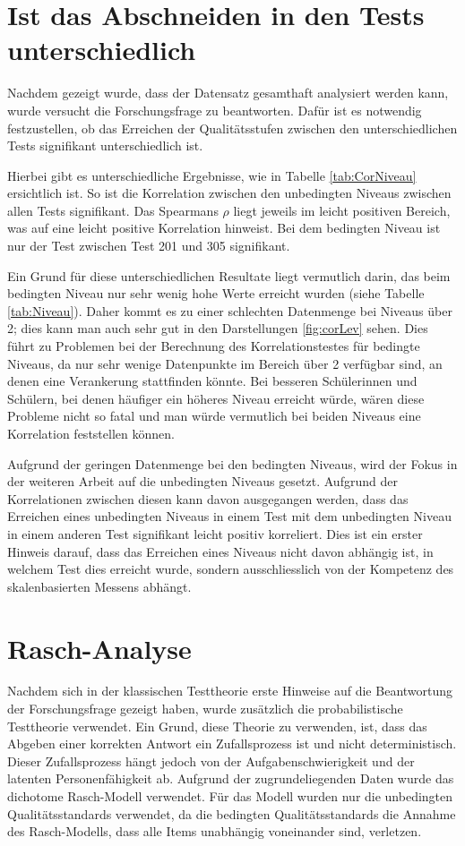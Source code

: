 \section{Ist das Abschneiden in den Tests unterschiedlich}

Nachdem gezeigt wurde, dass der Datensatz gesamthaft analysiert werden kann, wurde versucht die Forschungsfrage zu beantworten. Dafür ist es notwendig festzustellen, ob das Erreichen der Qualitätsstufen zwischen den unterschiedlichen Tests signifikant unterschiedlich ist.

Hierbei gibt es unterschiedliche Ergebnisse, wie in Tabelle \ref{tab:CorNiveau} ersichtlich ist. So ist die Korrelation zwischen den unbedingten Niveaus zwischen allen Tests signifikant. Das Spearmans $\rho$ liegt jeweils im leicht positiven Bereich, was auf eine leicht positive Korrelation hinweist. Bei dem bedingten Niveau ist nur der Test zwischen Test 201 und 305 signifikant.

Ein Grund für diese unterschiedlichen Resultate liegt vermutlich darin, das beim bedingten Niveau nur sehr wenig hohe Werte erreicht wurden (siehe Tabelle \ref{tab:Niveau}). Daher kommt es zu einer schlechten Datenmenge bei Niveaus über 2; dies kann man auch sehr gut in den Darstellungen \ref{fig:corLev} sehen. Dies führt zu Problemen bei der Berechnung des Korrelationstestes für bedingte Niveaus, da nur sehr wenige Datenpunkte im Bereich über 2 verfügbar sind, an denen eine Verankerung stattfinden könnte. Bei besseren Schülerinnen und Schülern, bei denen häufiger ein höheres Niveau erreicht würde, wären diese Probleme nicht so fatal und man würde vermutlich bei beiden Niveaus eine Korrelation feststellen können.

Aufgrund der geringen Datenmenge bei den bedingten Niveaus, wird der Fokus in der weiteren Arbeit auf die unbedingten Niveaus gesetzt. Aufgrund der Korrelationen zwischen diesen kann davon ausgegangen werden, dass das Erreichen eines unbedingten Niveaus in einem Test mit dem unbedingten Niveau in einem anderen Test signifikant leicht positiv korreliert. Dies ist ein erster Hinweis darauf, dass das Erreichen eines Niveaus nicht davon abhängig ist, in welchem Test dies erreicht wurde, sondern ausschliesslich von der Kompetenz des skalenbasierten Messens abhängt. 

\section{Rasch-Analyse}

Nachdem sich in der klassischen Testtheorie erste Hinweise auf die Beantwortung der Forschungsfrage gezeigt haben, wurde zusätzlich die probabilistische Testtheorie verwendet. Ein Grund, diese Theorie zu verwenden, ist, dass das Abgeben einer korrekten Antwort ein Zufallsprozess ist und nicht deterministisch. Dieser Zufallsprozess hängt jedoch von der Aufgabenschwierigkeit und der latenten Personenfähigkeit ab. Aufgrund der zugrundeliegenden Daten wurde das dichotome Rasch-Modell verwendet. Für das Modell wurden nur die unbedingten Qualitätsstandards verwendet, da die bedingten Qualitätsstandards die Annahme des Rasch-Modells, dass alle Items unabhängig voneinander sind, verletzen.

